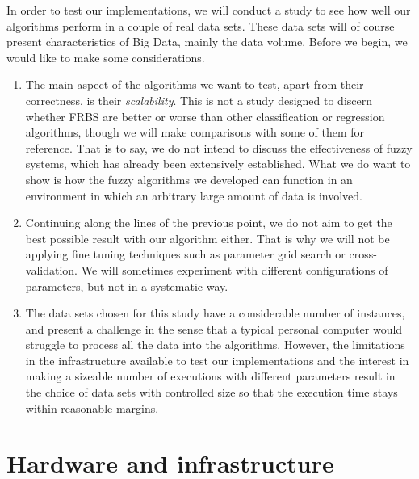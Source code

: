 %
%
%

In order to test our implementations, we will conduct a study to see how well our algorithms perform in a couple of real data sets. These data sets will of course present characteristics of Big Data, mainly the data volume. Before we begin, we would like to make some considerations.

\begin{enumerate}[1.]
  \item The main aspect of the algorithms we want to test, apart from their correctness, is their \textit{scalability}. This is not a study designed to discern whether FRBS are better or worse than other classification or regression algorithms, though we will make comparisons with some of them for reference. That is to say, we do not intend to discuss the effectiveness of fuzzy systems, which has already been extensively established. What we do want to show is how the fuzzy algorithms we developed can function in an environment in which an arbitrary large amount of data is involved.
  \item Continuing along the lines of the previous point, we do not aim to get the best possible result with our algorithm either. That is why we will not be applying fine tuning techniques such as parameter grid search or cross-validation. We will sometimes experiment with different configurations of parameters, but not in a systematic way.
  \item The data sets chosen for this study have a considerable number of instances, and present a challenge in the sense that a typical personal computer would struggle to process all the data into the algorithms. However, the limitations in the infrastructure available to test our implementations and the interest in making a sizeable number of executions with different parameters result in the choice of data sets with controlled size so that the execution time stays within reasonable margins.
\end{enumerate}

\section{Hardware and infrastructure}


